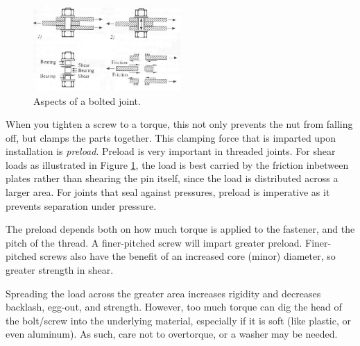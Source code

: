 \documentclass[10pt,letterpaper]{book}
\begin{document}
	
	\begin{figure}[H]
		\includegraphics[width=0.5\textwidth]{imgs/bolt_preload.png}
		\caption{Aspects of a bolted joint.}
		 \label{fig:bolted_joint} 
	\end{figure}
	
	When you tighten a screw to a torque, this not only prevents the nut from falling off, but clamps the parts together. This clamping force that is imparted upon installation is \textit{preload}. Preload is very important in threaded joints. For shear loads as illustrated in Figure \ref{fig:bolted_joint}, the load is best carried by the friction inbetween plates rather than shearing the pin itself, since the load is distributed across a larger area. For joints that seal against pressures, preload is imperative as it prevents separation under pressure.
	
	The preload depends both on how much torque is applied to the fastener, and the pitch of the thread. A finer-pitched screw will impart greater preload. Finer-pitched screws also have the benefit of an increased core (minor) diameter, so greater strength in shear.
	
	Spreading the load across the greater area increases rigidity and decreases backlash, egg-out, and strength. However, too much torque can dig the head of the bolt/screw into the underlying material, especially if it is soft (like plastic, or even aluminum). As such, care not to overtorque, or a washer may be needed.
	
\end{document}
